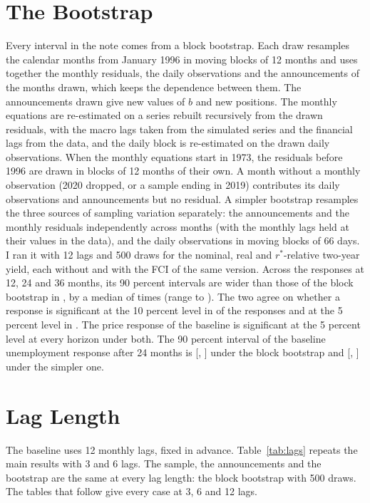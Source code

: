 \documentclass[11pt]{article}
\newcommand{\rs}{r^{*}}
\begin{document}
\begin{appendices}
\section{The Bootstrap}\label{app:boot}
Every interval in the note comes from a block bootstrap. Each draw resamples the  calendar months from January 1996 in moving blocks of 12 months and uses together the monthly residuals, the daily observations and the announcements of the months drawn, which keeps the dependence between them. The announcements drawn give new values of $b$ and new positions. The monthly equations are re-estimated on a series rebuilt recursively from the drawn residuals, with the macro lags taken from the simulated series and the financial lags from the data, and the daily block is re-estimated on the drawn daily observations. When the monthly equations start in 1973, the residuals before 1996 are drawn in blocks of 12 months of their own. A month without a monthly observation (2020 dropped, or a sample ending in 2019) contributes its daily observations and announcements but no residual. A simpler bootstrap resamples the three sources of sampling variation separately: the announcements and the monthly residuals independently across months (with the monthly lags held at their values in the data), and the daily observations in moving blocks of 66 days. I ran it with 12 lags and 500 draws for the nominal, real and $\rs$-relative two-year yield, each without and with the FCI of the same version. Across the  responses at 12, 24 and 36 months, its 90 percent intervals are wider than those of the block bootstrap in , by a median of  times (range  to ). The two agree on whether a response is significant at the 10 percent level in  of the  responses and at the 5 percent level in . The price response of the baseline is significant at the 5 percent level at every horizon under both. The 90 percent interval of the baseline unemployment response after 24 months is [, ] under the block bootstrap and [, ] under the simpler one.

\FloatBarrier
\section{Lag Length}\label{app:lags}
The baseline uses 12 monthly lags, fixed in advance. Table~\ref{tab:lags} repeats the main results with 3 and 6 lags. The sample, the announcements and the bootstrap are the same at every lag length: the block bootstrap with 500 draws. The tables that follow give every case at 3, 6 and 12 lags.


\end{appendices}
\end{document}
